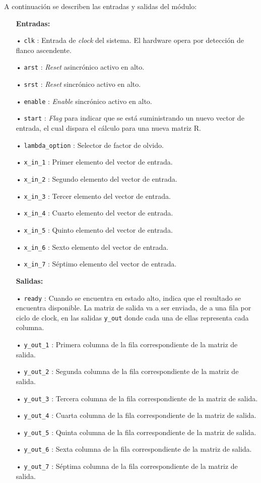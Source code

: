 A continuación se describen las entradas y salidas del módulo:

\begin{itemize}
	\item[ ] \textbf{Entradas:}
	\item[•] \verb;clk;    : Entrada de \textit{clock} del sistema. El hardware opera por detección de flanco ascendente.
	\item[•] \verb;arst;   : \textit{Reset} asincrónico activo en alto.
	\item[•] \verb;srst;   : \textit{Reset} sincrónico  activo en alto.
	\item[•] \verb;enable; : \textit{Enable} sincrónico activo en alto.
	\item[•] \verb;start;  : \textit{Flag} para indicar que se está suministrando un nuevo vector de entrada, el cual dispara el cálculo para una nueva matriz R.
	\item[•] \verb;lambda_option; : Selector de factor de olvido.
	\item[•] \verb;x_in_1; : Primer elemento del vector de entrada.
	\item[•] \verb;x_in_2; : Segundo elemento del vector de entrada.
	\item[•] \verb;x_in_3; : Tercer elemento del vector de entrada.
	\item[•] \verb;x_in_4; : Cuarto elemento del vector de entrada.
	\item[•] \verb;x_in_5; : Quinto elemento del vector de entrada.
	\item[•] \verb;x_in_6; : Sexto elemento del vector de entrada.
	\item[•] \verb;x_in_7; : Séptimo elemento del vector de entrada.
\end{itemize}

\begin{itemize}   
	\item[ ] \textbf{Salidas:}
	\item[•] \verb;ready;      : Cuando se encuentra en estado alto, indica que el resultado se encuentra disponible. La matriz de salida va a ser enviada, de a una fila por ciclo de clock, en las salidas \verb;y_out; donde cada una de ellas representa cada columna.
	\item[•] \verb;y_out_1;    : Primera columna de la fila correspondiente de la matriz de salida.
	\item[•] \verb;y_out_2;    : Segunda columna de la fila correspondiente de la matriz de salida.
	\item[•] \verb;y_out_3;    : Tercera columna de la fila correspondiente de la matriz de salida.
	\item[•] \verb;y_out_4;    : Cuarta columna de la fila correspondiente de la matriz de salida.
	\item[•] \verb;y_out_5;    : Quinta columna de la fila correspondiente de la matriz de salida.
	\item[•] \verb;y_out_6;    : Sexta columna de la fila correspondiente de la matriz de salida.
	\item[•] \verb;y_out_7;    : Séptima columna de la fila correspondiente de la matriz de salida.
\end{itemize}

